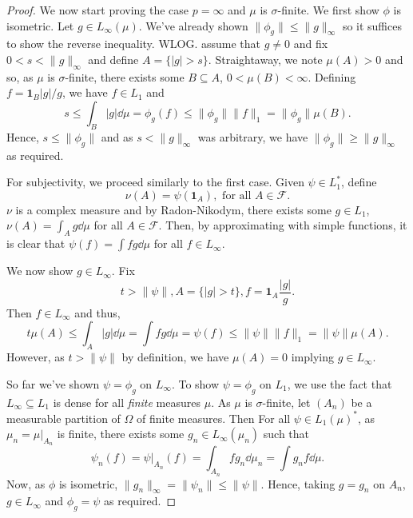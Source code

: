 \documentclass[]{article}
\theoremstyle{definition}
\begin{document}
\begin{proof}
  We now start proving the case \(p = \infty\) and \(\mu\) is \(\sigma\)-finite. We first show 
  \(\phi\) is isometric. Let \(g \in L_\infty(\mu)\). We've already shown \(\|\phi_g\| \le \|g\|_\infty\)
  so it suffices to show the reverse inequality. WLOG. assume that \(g \neq 0\) and fix \(0 < s < \|g\|_\infty\) 
  and define \(A = \{|g| > s\}\). Straightaway, we note \(\mu(A) > 0\) and so, as \(\mu\) is \(\sigma\)-finite, 
  there exists some \(B \subseteq A\), \(0 < \mu(B) < \infty\).
  Defining \(f = \mathbf{1}_B|g| / g\), we have \(f \in L_1\) and 
  \[s \le \int_B |g| \dd \mu = \phi_g(f) \le \|\phi_g\| \|f\|_1 = \|\phi_g\|\mu(B).\]
  Hence, \(s \le \|\phi_g\|\) and as \(s < \|g\|_\infty\) was arbitrary, we have \(\|\phi_g\| \ge \|g\|_\infty\) 
  as required.

  For subjectivity, we proceed similarly to the first case. Given \(\psi \in L_1^*\), define 
  \[\nu(A) = \psi(\mathbf{1}_A), \text{ for all } A \in \mathcal{F}.\]
  \(\nu\) is a complex measure and by Radon-Nikodym, there exists some \(g \in L_1\), \(\nu(A) = \int_A g \dd\mu\)
  for all \(A \in \mathcal{F}\). Then, by approximating with simple functions, it is clear that 
  \(\psi(f) = \int fg \dd \mu\) for all \(f \in L_\infty\).

  We now show \(g \in L_\infty\). Fix 
  \[t > \|\psi\|, A = \{|g| > t\}, f = \mathbf{1}_A \frac{|g|}{g}.\]
  Then \(f \in L_\infty\) and thus,
  \[t \mu(A) \le \int_A |g| \dd \mu = \int fg \dd \mu = \psi(f) \le \|\psi\|\|f\|_1 = \|\psi\| \mu(A).\]
  However, as \(t > \|\psi\|\) by definition, we have \(\mu(A) = 0\) implying \(g \in L_\infty\).

  So far we've shown \(\psi = \phi_g\) on \(L_\infty\). To show \(\psi = \phi_g\) on \(L_1\), we use 
  the fact that \(L_\infty \subseteq L_1\) is dense for all \textit{finite} measures \(\mu\). As \(\mu\) 
  is \(\sigma\)-finite, let \((A_n)\) be a measurable partition of \(\Omega\) of finite measures. Then 
  For all \(\psi \in L_1(\mu)^*\), as \(\mu_n = \mu|_{A_n}\) is finite, there exists some \(g_n \in L_\infty(\mu_n)\)
  such that 
  \[\psi_n(f) = \psi|_{A_n}(f) = \int_{A_n} fg_n \dd \mu_n = \int g_n f \dd\mu.\]
  Now, as \(\phi\) is isometric, \(\|g_n\|_\infty = \|\psi_n\| \le \|\psi\|\). Hence, taking \(g = g_n\) 
  on \(A_n\), \(g \in L_\infty\) and \(\phi_g = \psi\) as required. 
\end{proof} 
\end{document}
